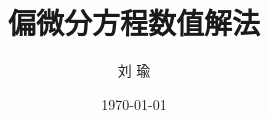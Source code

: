 \documentclass[a4paper,12pt]{book}
\theoremstyle{definition}
\begin{document}
\author{刘 \space 瑜}
\title{偏微分方程数值解法}
\date{\today}

\frontmatter
\maketitle
\tableofcontents

\mainmatter



%

\backmatter



%
%
%
\end{document}
